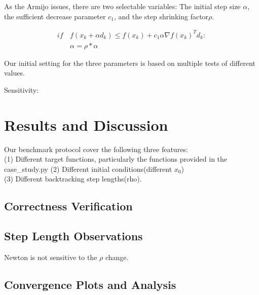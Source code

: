 \documentclass[12pt]{article}
\begin{document}
As the Armijo issues, there are two selectable variables: The initial step size $\alpha$, the sufficient decrease parameter $c_1$, and the step shrinking factor$\rho$. 

\begin{equation}
\begin{aligned}
if \, & f(x_k + \alpha d_k) \leq f(x_k) + c_1 \alpha \nabla f(x_k)^T d_k:\\
& \alpha = \rho * \alpha
\end{aligned}
\end{equation}

Our initial setting for the three parameters is based on multiple tests of different values. %

Sensitivity: %

\section{Results and Discussion}

Our benchmark protocol cover the following three features: \\

(1) Different target functions, particularly the functions provided in the case\_study.py
(2) Different initial conditions(different $x_0$)\\
(3) Different backtracking step lengths(rho).\\ 


\subsection{Correctness Verification}


\subsection{Step Length Observations}


Newton is not sensitive to the $\rho$ change.  %

\subsection{Convergence Plots and Analysis}
\end{document}
